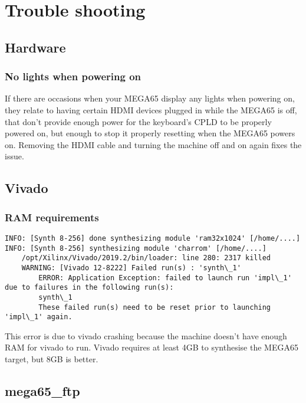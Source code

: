 \lstset{
    basicstyle=\small\ttfamily,
    columns=flexible,
    breaklines=true
}

\chapter{Trouble shooting}

\section{Hardware}
    \subsection{No lights when powering on}
    If there are occasions when your MEGA65 display any lights when powering on, they relate to having certain HDMI devices plugged in while the MEGA65 is off, that don't provide enough power for the keyboard's CPLD to be properly powered on, but enough to stop it properly resetting when the MEGA65 powers on. Removing the HDMI cable and turning the machine off and on again fixes the issue.

\section{Vivado}
    \subsection{RAM requirements}
    \begin{tcolorbox}[colback=black,coltext=white]
    \begin{lstlisting}
INFO: [Synth 8-256] done synthesizing module 'ram32x1024' [/home/....]
INFO: [Synth 8-256] synthesizing module 'charrom' [/home/....]
    /opt/Xilinx/Vivado/2019.2/bin/loader: line 280: 2317 killed
    WARNING: [Vivado 12-8222] Failed run(s) : 'synth\_1'
        ERROR: Application Exception: failed to launch run 'impl\_1' due to failures in the following run(s):
        synth\_1
        These failed run(s) need to be reset prior to launching 'impl\_1' again.
    \end{lstlisting}
    \end{tcolorbox}
This error is due to vivado crashing because the machine doesn't have enough RAM for vivado to run.
Vivado requires at least 4GB to synthesise the MEGA65 target, but 8GB is better.

\section{mega65\_ftp}
